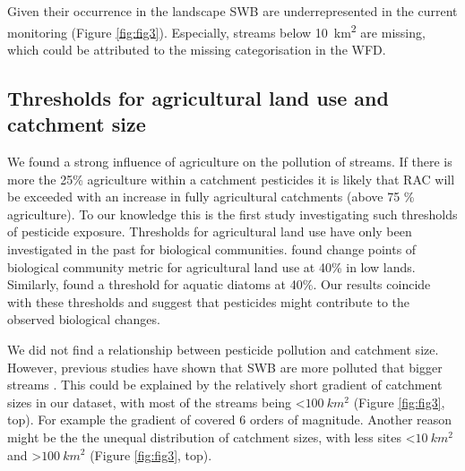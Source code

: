 \documentclass[journal=esthag,manuscript=article]{achemso}
\begin{document}
Given their occurrence in the landscape \citep{nadeau_hydrological_2007} SWB are underrepresented in the current monitoring (Figure \ref{fig:fig3}). 
Especially, streams below 10~km\textsuperscript{2} are missing, which could be attributed to the missing categorisation in the WFD. 



\subsection{Thresholds for agricultural land use and catchment size}
We found a strong influence of agriculture on the pollution of streams.
If there is more the 25\% agriculture within a catchment pesticides it is likely that RAC will be exceeded with an increase in fully agricultural catchments (above 75 \% agriculture).
To our knowledge this is the first study investigating such thresholds of pesticide exposure.
Thresholds for agricultural land use have only been investigated in the past for biological communities.
\citet{feld_response_2013} found change points of biological community metric for agricultural land use at 40\% in low lands. 
Similarly, \citet{waite_agricultural_2014} found a threshold for aquatic diatoms at 40\%.
Our results coincide with these thresholds and suggest that pesticides might contribute to the observed biological changes. 

We did not find a relationship between pesticide pollution and catchment size.
However, previous studies have shown that SWB are more polluted that bigger streams \citep{schulz_field_2004,stehle_pesticide_2015,knauer_pesticides_2016}.
This could be explained by the relatively short gradient of catchment sizes in our dataset, with most of the streams being \textless $100~km^2$ (Figure \ref{fig:fig3}, top).
For example the gradient of \citet{schulz_field_2004} covered 6 orders of magnitude.
Another reason might be the the unequal distribution of catchment sizes, with less sites \textless $10~km^2$ and \textgreater $100~km^2$ (Figure \ref{fig:fig3}, top).
\end{document}

